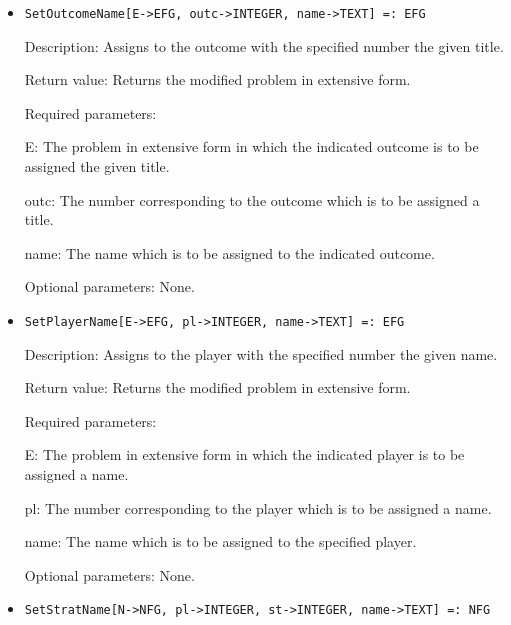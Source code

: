 \begin{itemize}
\item

\protect \large \begin{verbatim}
SetOutcomeName[E->EFG, outc->INTEGER, name->TEXT] =: EFG
\end{verbatim}\normalsize

\bd
\item
[Description:] Assigns to the outcome with the specified number the
given title.
\item
[Return value:] Returns the modified problem in extensive form.
\item
[Required parameters:]\hfil\null
	
\bd
\item
[E:] The problem in extensive form in which the indicated outcome is
to be assigned the given title.
\item
[outc:] The number corresponding to the outcome which is to be
assigned a title.
\item
[name:] The name which is to be assigned to the indicated outcome.
\ed

\item
[Optional parameters:] None.
\ed

\item

\protect \large \begin{verbatim}
SetPlayerName[E->EFG, pl->INTEGER, name->TEXT] =: EFG
\end{verbatim}\normalsize

\bd
\item
[Description:] Assigns to the player with the specified number the
given name.
\item
[Return value:] Returns the modified problem in extensive form.
\item
[Required parameters:]\hfil\null

\bd
\item
[E:] The problem in extensive form in which the indicated player is to
be assigned a name.
\item
[pl:] The number corresponding to the player which is to be assigned a
name.
\item
[name:] The name which is to be assigned to the specified player.
\ed
\item
[Optional parameters:] None.
\ed

\item

\protect \large \begin{verbatim}
SetStratName[N->NFG, pl->INTEGER, st->INTEGER, name->TEXT] =: NFG
\end{verbatim}\normalsize


\end{itemize}
